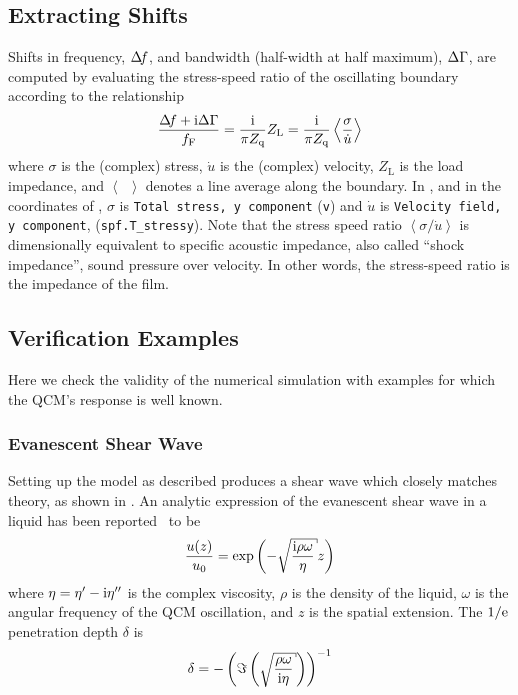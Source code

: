 \subsection{Extracting Shifts}
Shifts in frequency, $\Delta\!f$, and bandwidth (half-width at half maximum),
$\Delta\Gamma$, are computed by evaluating the stress-speed ratio of the oscillating
boundary according to the relationship
\begin{equation}
 \frac{\Delta\!f+{\mathrm{i}}\Delta\Gamma}{f_{\mathrm{F}}}=\frac{{\mathrm{i}}}{\pi Z_{\mathrm{q}}}Z_\mathrm{L} =\frac{{\mathrm{i}}}{\pi Z_{\mathrm{q}}}\left<\frac{\sigma}{\dot{u}}\right>
\label{eqn:comsolextract}
\end{equation}
where $\sigma$ is the (complex) stress, $\dot{u}$ is the (complex)
velocity, $Z_\mathrm{L}$ is the load impedance, and $\left<\enspace\right>$
denotes a line average along the boundary.  In \comsol, and in the
coordinates of , $\sigma$ is 
\texttt{Total stress, y component} (\texttt{v}) and $\dot{u}$ is 
\texttt{Velocity field, y component}, (\texttt{spf.T\_stressy}).  Note that
the stress speed ratio $\left<\sigma/\dot{u}\right>$ is dimensionally equivalent to
specific acoustic impedance, also called ``shock impedance'', sound
pressure over velocity.  In other words, the stress-speed ratio is the
impedance of the film. 

\subsection{Verification Examples}
Here we check the validity of the numerical simulation with examples for
which the QCM's response is well known.

\subsubsection{Evanescent Shear Wave}
Setting up the model as described produces a shear wave which closely
matches theory, as shown in .  An analytic expression
of the evanescent shear wave in a liquid has been reported~\cite{steinem2007piezoelectric} to be 
\begin{equation}
 \frac{u(z)}{u_0} = \exp\left(-\sqrt{\frac{\mi \rho \omega}{\eta}} z\right)
\end{equation}
where $\eta=\eta'-{\mathrm{i}}\eta''$ is the complex viscosity, $\rho$ is the density
of the liquid, $\omega$ is the angular frequency of the QCM oscillation,
and $z$ is the spatial extension.  The $1/{\mathrm{e}}$ penetration depth $\delta$ is
\begin{equation}
 \delta =
 -\left(\Im\left(\sqrt{\frac{\rho\omega}{\mi\eta}}\right)\right)^{-1}
 \label{eqn:suppshearwavedelta}
\end{equation}

